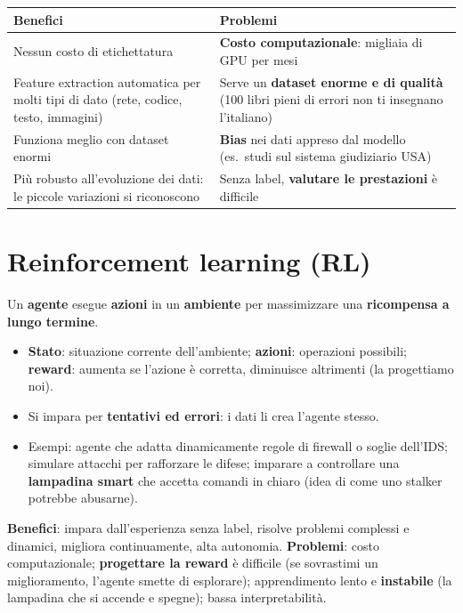 \begin{center}
\small
\begin{tabularx}{\textwidth}{X X}
\toprule
\textbf{Benefici} & \textbf{Problemi}\\
\midrule
Nessun costo di etichettatura & \textbf{Costo computazionale}: migliaia di GPU per mesi\\
Feature extraction automatica per molti tipi di dato (rete, codice, testo, immagini) & Serve un \textbf{dataset enorme e di qualità} (100 libri pieni di errori non ti insegnano l'italiano)\\
Funziona meglio con dataset enormi & \textbf{Bias} nei dati appreso dal modello (es.\ studi sul sistema giudiziario USA)\\
Più robusto all'evoluzione dei dati: le piccole variazioni si riconoscono & Senza label, \textbf{valutare le prestazioni} è difficile\\
\bottomrule
\end{tabularx}
\end{center}

\section{Reinforcement learning (RL)}
Un \textbf{agente} esegue \textbf{azioni} in un \textbf{ambiente} per massimizzare una \textbf{ricompensa a lungo termine}.
\begin{itemize}
  \item \textbf{Stato}: situazione corrente dell'ambiente; \textbf{azioni}: operazioni possibili;
        \textbf{reward}: aumenta se l'azione è corretta, diminuisce altrimenti (la progettiamo noi).
  \item Si impara per \textbf{tentativi ed errori}: i dati li crea l'agente stesso.
  \item Esempi: agente che adatta dinamicamente regole di firewall o soglie dell'IDS; simulare attacchi per rafforzare le
        difese; imparare a controllare una \textbf{lampadina smart} che accetta comandi in chiaro (idea di come uno stalker
        potrebbe abusarne).
\end{itemize}
\textbf{Benefici}: impara dall'esperienza senza label, risolve problemi complessi e dinamici, migliora continuamente,
alta autonomia. \textbf{Problemi}: costo computazionale; \textbf{progettare la reward} è difficile (se sovrastimi un
miglioramento, l'agente smette di esplorare); apprendimento lento e \textbf{instabile} (la lampadina che si accende e
spegne); bassa interpretabilità.

